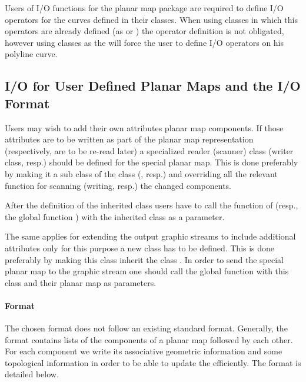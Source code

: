 

Users of I/O functions for the planar map package are required to
define I/O operators for the curves defined in their 
classes.  When using  classes in which this operators are
already defined (as  or  ) the
operator definition is not obligated, however using 
classes as the  will force the user to define
I/O operators on his polyline curve.

\begin{ccAdvanced}
\subsection*{I/O for User Defined Planar Maps and the I/O Format}

Users may wish to add their own attributes planar map components. If
those attributes are to be written as part of the planar map
representation (respectively, are to be re-read later) a specialized
reader (scanner) class (writer class, resp.) should be defined for the
special planar map. This is done preferably by making it a sub class
of the class  (,
resp.) and overriding all the relevant function for scanning (writing,
resp.) the changed components.

After the definition of the inherited class users have to call the
function  of  (resp., the global
function  ) with the inherited class as a
parameter. 

The same applies for extending the output graphic streams to include
additional attributes only for this purpose a new \/ class
has to be defined.  This is done preferably by making this class
inherit the class . In order to send the special
planar map to the graphic stream one should call the global function
 with this class and their planar map as parameters.

\paragraph{Format}
The chosen format does not follow an existing standard format.
Generally, the format contains lists of the components of a planar map 
followed by each other. For each component we write its associative
geometric information and some topological information in order to be
able to update the  efficiently. The format is detailed
below.


\end{ccAdvanced}

